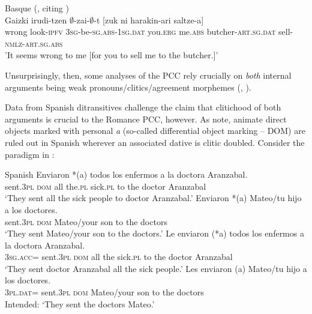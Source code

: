 \documentclass[output=paper,colorlinks,citecolor=brown,nonflat]{./langscibook}
\begin{document}
\ea%
    \label{ex:sheehan:10}
    Basque (\citealt[7]{Preminger2019}, citing \citealt[98]{Laka1996})\\
    \gll    Gaizki   irudi-tzen ${\emptyset}$-zai-${\emptyset}$-t         [zuk ni harakin-ari    saltze-a]\\
          wrong   look-\textsc{ipfv} \textsc{3sg}-be-\textsc{sg}.\textsc{abs}{}-\textsc{1sg}.\textsc{dat}  {\db}you.\textsc{erg}    me.\textsc{abs} butcher-\textsc{art.sg}.\textsc{dat} sell-\textsc{nmlz-art.sg.abs}\\
    \glt 'It seems wrong to me [for you to sell me to the butcher.]' 
\z

Unsurprisingly, then, some analyses of the PCC rely crucially on \textit{both} internal arguments being weak pronouns/clitics/agreement morphemes (\citealt{Bianchi2006}, \citealt{Stegovec2017}). 

Data from Spanish ditransitives challenge the claim that clitichood of both arguments is crucial to the Romance PCC, however. As \citet{OrmazabalRomero2013Borealis} note, animate direct objects marked with personal \textit{a} (so-called differential object marking – DOM) are ruled out in Spanish wherever an associated dative is clitic doubled. Consider the paradigm in :

\ea%
    \label{ex:sheehan:11}
    Spanish \citep[224]{OrmazabalRomero2013Borealis}
    \ea\label{ex:sheehan:11a}
    \gll   Enviaron   *(a)   todos los   enfermos a   la   doctora   Aranzabal.\\
        sent.\textsc{3pl}  \textsc{dom}   all   the.\textsc{pl}   sick.\textsc{pl}  to   the   doctor   Aranzabal\\
    \glt ‘They sent all the sick people to doctor Aranzabal.’
    \ex\label{ex:sheehan:11b}
    \gll   Enviaron  *(a)   Mateo/tu   hijo   a   los   doctores.\\
        sent.\textsc{3pl}  \textsc{dom}   Mateo/your   son   to   the   doctors\\
    \glt ‘They sent Mateo/your son to the doctors.’ 
    \ex\label{ex:sheehan:11c}
    \gll   Le   enviaron   (*a)  todos   los  enfermos   a  la  doctora   Aranzabal.\\
        \textsc{3sg.acc=} sent.\textsc{3pl}   \textsc{dom}   all   the sick.\textsc{pl}   to   the doctor Aranzabal\\
    \glt ‘They sent doctor Aranzabal all the sick people.’
    \ex\label{ex:sheehan:11d}
    \gll    *Les   enviaron   (a)   Mateo/tu   hijo  a   los   doctores.\\
        \textsc{3pl.dat}=  sent.\textsc{3pl}   \textsc{dom}   Mateo/your   son   to   the   doctors\\
    \glt Intended: ‘They sent the doctors Mateo.’
    \z
\z
\end{document}
